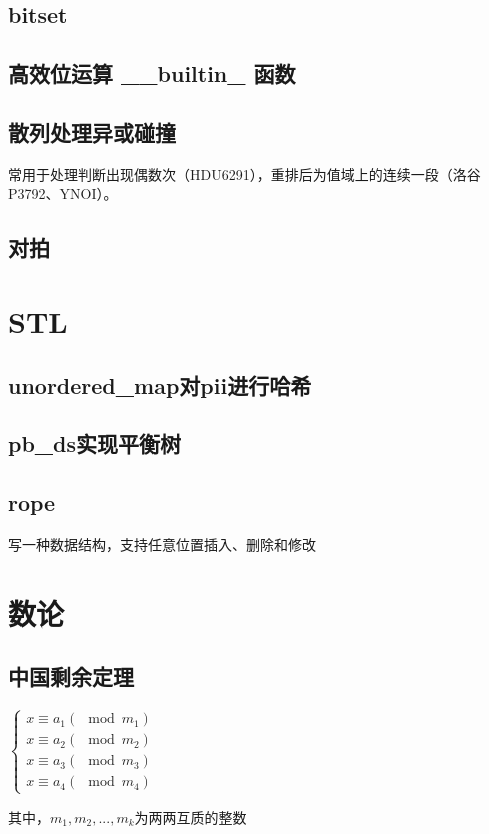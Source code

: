 \documentclass[twoside,a4paper]{article}
\begin{document}
\subsection{bitset}


\subsection{高效位运算 \_\_builtin\_ 函数}


\subsection{散列处理异或碰撞}
常用于处理判断出现偶数次（HDU6291），重排后为值域上的连续一段（洛谷P3792、YNOI）。


\subsection{对拍}



\section{STL}

\subsection{unordered\_map对pii进行哈希}


\subsection{pb\_ds实现平衡树}


\subsection{rope}
写一种数据结构，支持任意位置插入、删除和修改



\section{数论}

\subsection{中国剩余定理}
$\left\{\begin{matrix} x \equiv a_{1} (\mod m_{1})\\ x \equiv a_{2} (\mod m_{2})\\  x \equiv a_{3} (\mod m_{3})\\  x \equiv a_{4} (\mod m_{4})\end{matrix}\right.$ \par
其中，$m_1,m_2,...,m_k$为两两互质的整数

\end{document}
